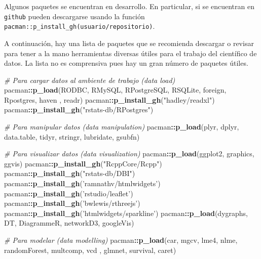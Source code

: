 \documentclass[]{article}
\newenvironment{Shaded}{\begin{snugshade}}{\end{snugshade}}
\newcommand{\KeywordTok}[1]{\textcolor[rgb]{0.13,0.29,0.53}{\textbf{#1}}}
\newcommand{\StringTok}[1]{\textcolor[rgb]{0.31,0.60,0.02}{#1}}
\newcommand{\CommentTok}[1]{\textcolor[rgb]{0.56,0.35,0.01}{\textit{#1}}}
\newcommand{\OperatorTok}[1]{\textcolor[rgb]{0.81,0.36,0.00}{\textbf{#1}}}
\newcommand{\NormalTok}[1]{#1}
\begin{document}
Algunos paquetes se encuentran en desarrollo. En particular, si se
encuentran en \texttt{github} pueden descargarse usando la función
\texttt{pacman::p\_install\_gh(\textquotesingle{}usuario/repositorio\textquotesingle{})}.

A continuación, hay una lista de paquetes que se recomienda descargar o
revisar para tener a la mano herramientas diversas útiles para el
trabajo del científico de datos. La lista no es comprensiva pues hay un
gran número de paquetes útiles.

\begin{Shaded}
\begin{Highlighting}[]
\CommentTok{# Para cargar datos al ambiente de trabajo (data load)}
\NormalTok{pacman}\OperatorTok{::}\KeywordTok{p_load}\NormalTok{(RODBC, RMySQL, RPostgreSQL, RSQLite, foreign, Rpostgres, haven}
\NormalTok{               , readr)}
\NormalTok{pacman}\OperatorTok{::}\KeywordTok{p_install_gh}\NormalTok{(}\StringTok{"hadley/readxl"}\NormalTok{)}
\NormalTok{pacman}\OperatorTok{::}\KeywordTok{p_install_gh}\NormalTok{(}\StringTok{"rstats-db/RPostgres"}\NormalTok{)}

\CommentTok{# Para manipular datos (data manipulation)}
\NormalTok{pacman}\OperatorTok{::}\KeywordTok{p_load}\NormalTok{(plyr, dplyr, data.table, tidyr, stringr, lubridate, gsubfn)}

\CommentTok{# Para visualizar datos (data visualization)}
\NormalTok{pacman}\OperatorTok{::}\KeywordTok{p_load}\NormalTok{(ggplot2, graphics, ggvis)}
\NormalTok{pacman}\OperatorTok{::}\KeywordTok{p_install_gh}\NormalTok{(}\StringTok{"RcppCore/Rcpp"}\NormalTok{)}
\NormalTok{pacman}\OperatorTok{::}\KeywordTok{p_install_gh}\NormalTok{(}\StringTok{"rstats-db/DBI"}\NormalTok{)}
\NormalTok{pacman}\OperatorTok{::}\KeywordTok{p_install_gh}\NormalTok{(}\StringTok{'ramnathv/htmlwidgets'}\NormalTok{)}
\NormalTok{pacman}\OperatorTok{::}\KeywordTok{p_install_gh}\NormalTok{(}\StringTok{'rstudio/leaflet'}\NormalTok{)}
\NormalTok{pacman}\OperatorTok{::}\KeywordTok{p_install_gh}\NormalTok{(}\StringTok{'bwlewis/rthreejs'}\NormalTok{)}
\NormalTok{pacman}\OperatorTok{::}\KeywordTok{p_install_gh}\NormalTok{(}\StringTok{'htmlwidgets/sparkline'}\NormalTok{)}
\NormalTok{pacman}\OperatorTok{::}\KeywordTok{p_load}\NormalTok{(dygraphs, DT, DiagrammeR, networkD3, googleVis)}

\CommentTok{# Para modelar (data modelling)}
\NormalTok{pacman}\OperatorTok{::}\KeywordTok{p_load}\NormalTok{(car, mgcv, lme4, nlme, randomForest, multcomp, vcd}
\NormalTok{               , glmnet, survival, caret)}


\end{Highlighting}
\end{Shaded}
\end{document}
